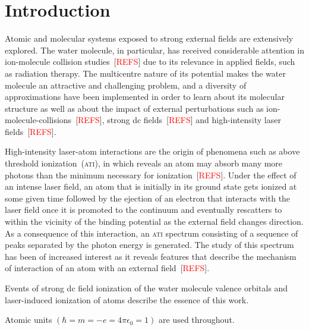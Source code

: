 \chapter{Introduction}
\label{cha:introduction}


Atomic and molecular systems exposed to strong external fields are
extensively explored.
The water molecule, in particular, has received considerable attention
in ion-molecule collision studies~[\textcolor{red}{REFS}] due to its
relevance in applied fields, such as radiation therapy. The
multicentre nature of its potential makes the water molecule an
attractive and challenging problem, and a diversity of approximations
have been implemented in order to learn about its molecular structure
as well as about the impact of external perturbations such as
ion-molecule-collisions~[\textcolor{red}{REFS}], strong dc
fields~[\textcolor{red}{REFS}] and high-intensity laser
fields~[\textcolor{red}{REFS}].

High-intensity laser-atom interactions are the origin of phenomena
such as above threshold ionization~(\textsc{ati}), in which reveals an
atom may absorb many more photons than the minimum necessary for
ionization~[\textcolor{red}{REFS}].
Under the effect of an intense laser field, an atom that is initially
in its ground state gets ionized at some given time followed by the
ejection of an electron that interacts with the laser field once it is
promoted to the continuum and eventually rescatters to within the
vicinity of the binding potential as the external field changes
direction. As a consequence of this interaction, an \textsc{ati}
spectrum consisting of a sequence of peaks separated by the photon
energy is generated. The study of this spectrum has been of increased
interest as it reveals features that describe the mechanism of
interaction of an atom with an external field~[\textcolor{red}{REFS}].

Events of strong dc field ionization of the water molecule valence
orbitals and laser-induced ionization of atoms describe the essence of
this work.






Atomic units $(\hbar = m = -e = 4\pi\epsilon_{0} = 1)$ are used
throughout.
































